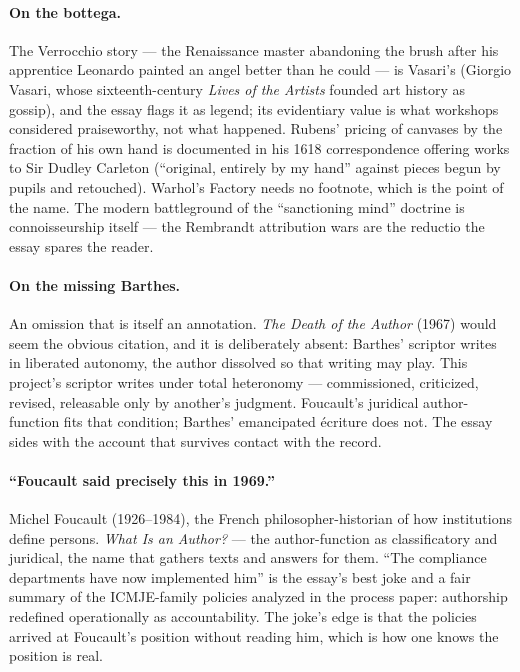 \documentclass[11pt]{article}
\begin{document}
\paragraph{On the bottega.} The Verrocchio story — the Renaissance master abandoning the brush after his apprentice Leonardo painted an angel better than he could — is Vasari's (Giorgio Vasari, whose sixteenth-century \emph{Lives of the Artists} founded art history as gossip), and the essay flags it as legend; its evidentiary value is what workshops considered praiseworthy, not what happened. Rubens' pricing of canvases by the fraction of his own hand is documented in his 1618 correspondence offering works to Sir Dudley Carleton (``original, entirely by my hand'' against pieces begun by pupils and retouched). Warhol's Factory needs no footnote, which is the point of the name. The modern battleground of the ``sanctioning mind'' doctrine is connoisseurship itself — the Rembrandt attribution wars are the reductio the essay spares the reader.

\paragraph{On the missing Barthes.} An omission that is itself an annotation. \emph{The Death of the Author} (1967) would seem the obvious citation, and it is deliberately absent: Barthes' scriptor writes in liberated autonomy, the author dissolved so that writing may play. This project's scriptor writes under total heteronomy — commissioned, criticized, revised, releasable only by another's judgment. Foucault's juridical author-function fits that condition; Barthes' emancipated écriture does not. The essay sides with the account that survives contact with the record.

\paragraph{``Foucault said precisely this in 1969.''} Michel Foucault (1926--1984), the French philosopher-historian of how institutions define persons. \emph{What Is an Author?} — the author-function as classificatory and juridical, the name that gathers texts and answers for them. ``The compliance departments have now implemented him'' is the essay's best joke and a fair summary of the ICMJE-family policies analyzed in the process paper: authorship redefined operationally as accountability. The joke's edge is that the policies arrived at Foucault's position without reading him, which is how one knows the position is real.
\end{document}

